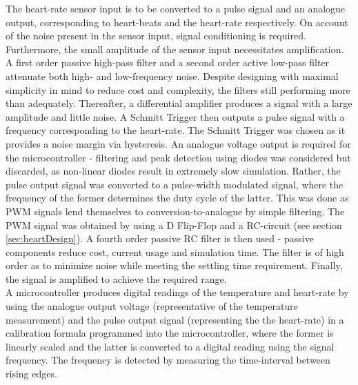 
The heart-rate sensor input is to be converted to a pulse signal and an analogue output, corresponding to heart-beats and the heart-rate respectively. On account of the noise present in the sensor input, signal conditioning  is required. Furthermore, the small amplitude of the sensor input necessitates amplification. A first order passive high-pass filter and a second order active low-pass filter attenuate both high- and low-frequency noise. Despite designing with maximal simplicity in mind to reduce cost and complexity, the filters still performing more than adequately. Thereafter, a differential amplifier produces a signal with a large amplitude and little noise. A Schmitt Trigger then outputs a pulse signal with a frequency corresponding to the heart-rate. The Schmitt Trigger was chosen as it provides a noise margin via hysteresis. An analogue voltage output is required for the microcontroller - filtering and peak detection using diodes was considered but discarded, as non-linear diodes result in extremely slow simulation. Rather, the pulse output signal was converted to a pulse-width modulated signal, where the frequency of the former determines the duty cycle of the latter. This was done as PWM signals lend themselves to conversion-to-analogue by simple filtering. The PWM signal was obtained by using a D Flip-Flop and a RC-circuit (see section \ref{sec:heartDesign}). A fourth order passive RC filter is then used - passive components reduce cost, current usage and simulation time. The filter is of high order as to minimize noise while meeting the settling time requirement. Finally, the signal is amplified to achieve the required range.\\

A microcontroller produces digital readings of the temperature and heart-rate by using the analogue output voltage (representative of the temperature measurement) and the pulse output signal (representing the the heart-rate) in a calibration formula programmed into the microcontroller, where the former is linearly scaled and the latter is converted to a digital reading using the signal frequency. The frequency is detected by measuring the time-interval between rising edges.\\


